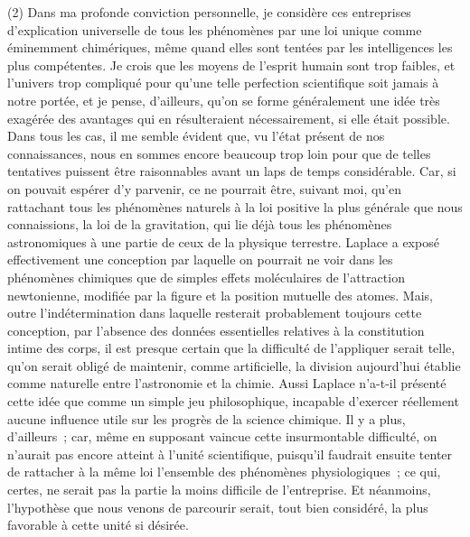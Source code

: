 \documentclass[french,twoside]{book} %
\begin{document}
(2) Dans ma profonde conviction personnelle, je considère ces entreprises d’explication universelle de tous les phénomènes par une loi unique comme éminemment chimériques, même quand elles sont tentées par les intelligences les plus compétentes. Je crois que les moyens de l’esprit humain sont trop faibles, et l’univers trop compliqué pour qu’une telle perfection scientifique soit jamais à notre portée, et je pense, d’ailleurs, qu’on se forme généralement une idée très exagérée des avantages qui en résulteraient nécessairement, si elle était possible. Dans tous les cas, il me semble évident que, vu l’état présent de nos connaissances, nous en sommes encore beaucoup trop loin pour que de telles tentatives puissent être raisonnables avant un laps de temps considérable. Car, si on pouvait espérer d’y parvenir, ce ne pourrait être, suivant moi, qu’en rattachant tous les phénomènes naturels à la loi positive la plus générale que nous connaissions, la loi de la gravitation, qui lie déjà tous les phénomènes astronomiques à une partie de ceux de la physique terrestre. Laplace a exposé effectivement une conception par laquelle on pourrait ne voir dans les phénomènes chimiques que de simples effets moléculaires de l’attraction newtonienne, modifiée par la figure et la position mutuelle des atomes. Mais, outre l’indétermination dans laquelle resterait probablement toujours cette conception, par l’absence des données essentielles relatives à la constitution intime des corps, il est presque certain que la difficulté de l’appliquer serait telle, qu’on serait obligé de maintenir, comme artificielle, la division aujourd’hui établie comme naturelle entre l’astronomie et la chimie. Aussi Laplace n’a-t-il présenté cette idée que comme un simple jeu philosophique, incapable d’exercer réellement aucune influence utile sur les progrès de la science chimique. Il y a plus, d’ailleurs ; car, même en supposant vaincue cette insurmontable difficulté, on n’aurait pas encore atteint à l’unité scientifique, puisqu’il faudrait ensuite tenter de rattacher à la même loi l’ensemble des phénomènes physiologiques ; ce qui, certes, ne serait pas la partie la moins difficile de l’entreprise. Et néanmoins, l’hypothèse que nous venons de parcourir serait, tout bien considéré, la plus favorable à cette unité si désirée.\par
\end{document}
